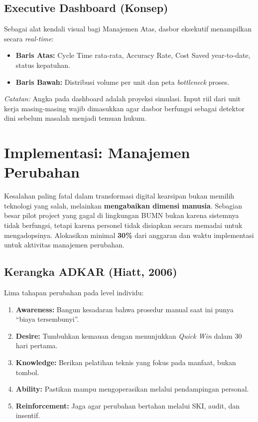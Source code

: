 \documentclass[11pt,a4paper]{article}
\begin{document}
\subsection{Executive Dashboard (Konsep)}
Sebagai alat kendali visual bagi Manajemen Atas, dasbor eksekutif menampilkan secara \textit{real-time}:
\begin{itemize}
    \item \textbf{Baris Atas:} Cycle Time rata-rata, Accuracy Rate, Cost Saved year-to-date, status kepatuhan.
    \item \textbf{Baris Bawah:} Distribusi volume per unit dan peta \textit{bottleneck} proses.
\end{itemize}
\textit{Catatan:} Angka pada dashboard adalah proyeksi simulasi. Input riil dari unit kerja masing-masing wajib dimasukkan agar dasbor berfungsi sebagai detektor dini sebelum masalah menjadi temuan hukum.


\newpage

\section{Implementasi: Manajemen Perubahan}

\begin{warnbox}
Kesalahan paling fatal dalam transformasi digital kearsipan bukan memilih teknologi yang salah, melainkan \textbf{mengabaikan dimensi manusia}. Sebagian besar pilot project yang gagal di lingkungan BUMN bukan karena sistemnya tidak berfungsi, tetapi karena personel tidak disiapkan secara memadai untuk mengadopsinya. Alokasikan minimal \textbf{30\%} dari anggaran dan waktu implementasi untuk aktivitas manajemen perubahan.
\end{warnbox}

\subsection{Kerangka ADKAR (Hiatt, 2006)}
Lima tahapan perubahan pada level individu:
\begin{enumerate}
    \item \textbf{Awareness:} Bangun kesadaran bahwa prosedur manual saat ini punya ``biaya tersembunyi''.
    \item \textbf{Desire:} Tumbuhkan kemauan dengan menunjukkan \textit{Quick Win} dalam 30 hari pertama.
    \item \textbf{Knowledge:} Berikan pelatihan teknis yang fokus pada manfaat, bukan tombol.
    \item \textbf{Ability:} Pastikan mampu mengoperasikan melalui pendampingan personal.
    \item \textbf{Reinforcement:} Jaga agar perubahan bertahan melalui SKI, audit, dan insentif.
\end{enumerate}
\end{document}
